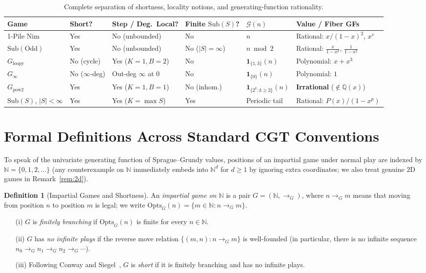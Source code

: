 \documentclass[11pt]{article}
\theoremstyle{definition}
\newtheorem{definition}[theorem]{Definition}
\theoremstyle{remark}
\newcommand{\N}{\mathbb{N}}
\newcommand{\Q}{\mathbb{Q}}
\newcommand{\G}{\mathcal{G}}
\newcommand{\Opts}{\mathrm{Opts}}
\newcommand{\Sub}{\mathrm{Sub}}
\begin{document}
\begin{table}[ht]
\centering
\footnotesize
\setlength{\tabcolsep}{3.5pt}
\begin{tabular}{@{}llllll@{}}
\toprule
Game & Short? & Step / Deg.\ Local? & Finite $\Sub(S)$? & $\G(n)$ & Value / Fiber GFs \\
\midrule
1-Pile Nim & Yes & No (unbounded) & No & $n$ & Rational: $x/(1-x)^2,\, x^v$ \\[3pt]
$\Sub(\mathrm{Odd})$ & Yes & No (unbounded) & No ($|S|=\infty$) & $n \bmod 2$ & Rational: $\frac{x}{1-x^2},\, \frac{1}{1-x^2}$ \\[3pt]
$G_{\mathrm{loopy}}$ & No (cycle) & Yes ($K=1, B=2$) & No & $\mathbf{1}_{\{1,3\}}(n)$ & Polynomial: $x + x^3$ \\[3pt]
$G_{\infty}$ & No ($\infty$-deg) & Out-deg $\infty$ at $0$ & No & $\mathbf{1}_{\{0\}}(n)$ & Polynomial: $1$ \\[3pt]
$G_{\mathrm{pow2}}$ & Yes & Yes ($K=1, B=1$) & No (inhom.) & $\mathbf{1}_{\{2^k:k\ge 2\}}(n)$ & \textbf{Irrational} ($\notin \Q(x)$) \\[3pt]
$\Sub(S)$, $|S|<\infty$ & Yes & Yes ($K=\max S$) & Yes & Periodic tail & Rational: $P(x)/(1-x^p)$ \\
\bottomrule
\end{tabular}
\caption{Complete separation of shortness, locality notions, and generating-function rationality.}
\label{tab:summary}
\end{table}

\section{Formal Definitions Across Standard CGT Conventions}
\label{sec:defs}

To speak of the univariate generating function of Sprague--Grundy values, positions of an impartial game under normal play are indexed by $\N = \{0,1,2,\dots\}$ (any counterexample on $\N$ immediately embeds into $\N^d$ for $d \ge 1$ by ignoring extra coordinates; we also treat genuine $2$D games in Remark~\ref{rem:2d}).

\begin{definition}[Impartial Games and Shortness]
An \emph{impartial game on $\N$} is a pair $G = (\N, \to_G)$, where $n \to_G m$ means that moving from position $n$ to position $m$ is legal; we write $\Opts_G(n) = \{m \in \N : n \to_G m\}$.
\begin{itemize}
  \item[(i)] $G$ is \emph{finitely branching} if $\Opts_G(n)$ is finite for every $n \in \N$.
  \item[(ii)] $G$ has \emph{no infinite plays} if the reverse move relation $\{(m,n) : n \to_G m\}$ is well-founded (in particular, there is no infinite sequence $n_0 \to_G n_1 \to_G n_2 \to_G \cdots$).
  \item[(iii)] Following Conway and Siegel~\cite{BCG,Siegel}, $G$ is \emph{short} if it is finitely branching and has no infinite plays.
\end{itemize}
\end{definition}
\end{document}
